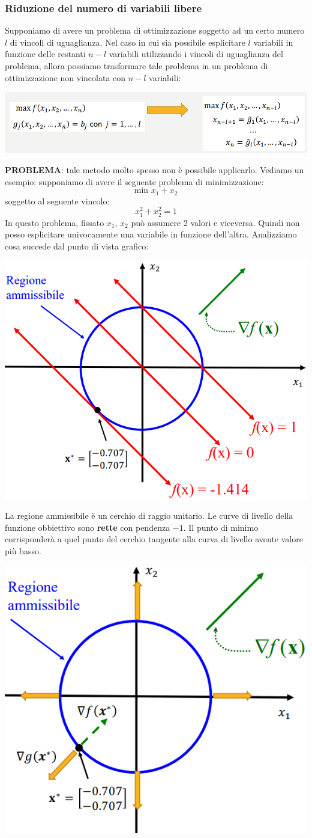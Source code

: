 \documentclass[12pt]{article}
\begin{document}
\subsubsection{Riduzione del numero di variabili libere}
Supponiamo di avere un problema di ottimizzazione soggetto ad un certo numero $l$ di vincoli di uguaglianza.
Nel caso in cui sia possibile esplicitare $l$ variabili in funzione delle restanti $n-l$ variabili utilizzando i vincoli di uguaglianza
del problema, allora possiamo trasformare tale problema in un problema di ottimizzazione non vincolata con $n-l$ variabili:
\begin{center}
    \includegraphics[width = 1\linewidth]{Images/103.PNG}
\end{center}
\textbf{PROBLEMA}: tale metodo molto spesso non è possibile applicarlo. Vediamo un esempio:
supponiamo di avere il seguente problema di minimizzazione:
$$\textrm{min } x_1 + x_2$$
soggetto al seguente vincolo:
$$x_1^2 + x_2^2 = 1$$
In questo problema, fissato $x_1$, $x_2$ può assumere 2 valori e viceversa. Quindi non posso esplicitare univocamente una variabile in funzione dell'altra.
Analizziamo cosa succede dal punto di vista grafico:
\begin{center}
    \includegraphics[width = 0.50\linewidth]{Images/104.PNG}
\end{center}
La regione ammissibile è un cerchio di raggio unitario. Le curve di livello della funzione obbiettivo sono \textbf{rette} con pendenza $-1$.
Il punto di minimo corrisponderà a quel punto del cerchio tangente alla curva di livello avente valore più basso.
\begin{center}
    \includegraphics[width = 0.50\linewidth]{Images/105.PNG}
\end{center}
\end{document}
